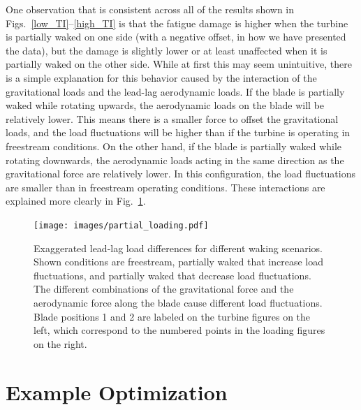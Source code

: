 \documentclass[11pt,letterpaper]{article}
\begin{document}
One observation that is consistent across all of the results shown in Figs.~\ref{low_TI}--\ref{high_TI} is that the fatigue damage is higher when the turbine is partially waked on one side (with a negative offset, in how we have presented the data), but the damage is slightly lower or at least unaffected when it is partially waked on the other side. While at first this may seem unintuitive, there is a simple explanation for this behavior caused by the interaction of the gravitational loads and the lead-lag aerodynamic loads. If the blade is partially waked while rotating upwards, the aerodynamic loads on the blade will be relatively lower. This means there is a smaller force to offset the gravitational loads, and the load fluctuations will be higher than if the turbine is operating in freestream conditions. On the other hand, if the blade is partially waked while rotating downwards, the aerodynamic loads acting in the same direction as the gravitational force are relatively lower. In this configuration, the load fluctuations are smaller than in freestream operating conditions. These interactions are explained more clearly in Fig.~\ref{partial_loading}.
% 
\begin{figure}
    \centering
    \texttt{[image: images/partial\_loading.pdf]}
    \caption{Exaggerated lead-lag load differences for different waking scenarios. Shown conditions are freestream, partially waked that increase load fluctuations, and partially waked that decrease load fluctuations. The different combinations of the gravitational force and the aerodynamic force along the blade cause different load fluctuations. Blade positions 1 and 2 are labeled on the turbine figures on the left, which correspond to the numbered points in the loading figures on the right. }
    \label{partial_loading}
\end{figure}

\section{Example Optimization}
\end{document}
